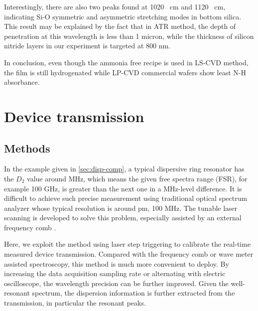 Interestingly, there are also two peaks found at 1020 \si{\per\cm} and 1120 \si{\per\cm}, indicating Si-O symmetric and asymmetric stretching modes in bottom silica. This result may be explained by the fact that in ATR method, the depth of penetration at this wavelength is less than 1 micron, while the thickness of silicon nitride layers in our experiment is targeted at 800 nm.


\begin{figure}
	\centering
	
	\label{fig:ftir}
\end{figure}

In conclusion, even though the ammonia free recipe is used in LS-CVD method, the film is still hydrogenated while LP-CVD commercial wafers show least N-H absorbance.

\begin{figure}
	\centering
	
	\label{fig:ellipso}
\end{figure}

\section{Device transmission}

\subsection{Methods}

In the example given in \autoref{sec:disp-comp},  a typical dispersive ring resonator has the $ D_2 $ value around MHz, which means the given free spectra range (FSR), for example 100 GHz, is greater than the next one in a MHz-level difference. It is difficult to achieve such precise measurement using traditional optical spectrum analyzer whose typical resolution is around pm, 100 MHz. The tunable laser scanning is developed to solve this problem, especially assisted by an external frequency comb \cite{Liu2016d}. 

Here, we exploit the method using laser step triggering to calibrate the real-time measured device transmission. Compared with the frequency comb or wave meter assisted spectroscopy, this method is much more convenient to deploy. By increasing the data acquisition sampling rate or alternating with electric oscilloscope, the wavelength precision can be further improved.
Given the well-resonant spectrum, the dispersion information is further extracted from the transmission, in particular the resonant peaks. 

